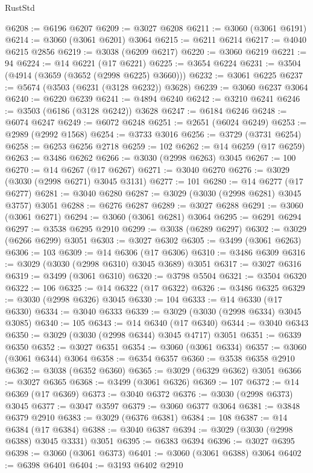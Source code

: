 \begin{lexlean}{RustStd}
\begin{coremodule}
@6208 := @6196 @6207
@6209 := @3027 @6208
@6211 := @3060 (@3061 @6191)
@6214 := @3060 (@3061 @6201) @3064
@6215 := @6211 @6214
@6217 := @4040 @6215 @2856
@6219 := @3038 (@6209 @6217)
@6220 := @3060 @6219
@6221 := 94
@6224 := @14 @6221 (@17 @6221)
@6225 := @3654 @6224
@6231 := @3504 (@4914 (@3659 (@3652 (@2998 @6225) @3660)))
@6232 := @3061 @6225
@6237 := @5674 (@3503 (@6231 (@3128 @6232)) @3628)
@6239 := @3060 @6237 @3064
@6240 := @6220 @6239
@6241 := @4894 @6240
@6242 := @3210 @6241
@6246 := @3503 (@6186 (@3128 @6242)) @3628
@6247 := @6184 @6246
@6248 := @6074 @6247
@6249 := @6072 @6248
@6251 := @2651 (@6024 @6249)
@6253 := @2989 (@2992 @1568)
@6254 := @3733 @3016
@6256 := @3729 (@3731 @6254)
@6258 := @6253 @6256 @2718
@6259 := 102
@6262 := @14 @6259 (@17 @6259)
@6263 := @3486 @6262
@6266 := @3030 (@2998 @6263) @3045
@6267 := 100
@6270 := @14 @6267 (@17 @6267)
@6271 := @3040 @6270
@6276 := @3029 (@3030 (@2998 @6271) @3045 @3131)
@6277 := 101
@6280 := @14 @6277 (@17 @6277)
@6281 := @3040 @6280
@6287 := @3029 (@3030 (@2998 @6281) @3045 @3757) @3051
@6288 := @6276 @6287
@6289 := @3027 @6288
@6291 := @3060 (@3061 @6271)
@6294 := @3060 (@3061 @6281) @3064
@6295 := @6291 @6294
@6297 := @3538 @6295 @2910
@6299 := @3038 (@6289 @6297)
@6302 := @3029 (@6266 @6299) @3051
@6303 := @3027 @6302
@6305 := @3499 (@3061 @6263)
@6306 := 103
@6309 := @14 @6306 (@17 @6306)
@6310 := @3486 @6309
@6316 := @3029 (@3030 (@2998 @6310) @3045 @3689) @3051
@6317 := @3027 @6316
@6319 := @3499 (@3061 @6310)
@6320 := @3798 @5504
@6321 := @3504 @6320
@6322 := 106
@6325 := @14 @6322 (@17 @6322)
@6326 := @3486 @6325
@6329 := @3030 (@2998 @6326) @3045
@6330 := 104
@6333 := @14 @6330 (@17 @6330)
@6334 := @3040 @6333
@6339 := @3029 (@3030 (@2998 @6334) @3045 @3085)
@6340 := 105
@6343 := @14 @6340 (@17 @6340)
@6344 := @3040 @6343
@6350 := @3029 (@3030 (@2998 @6344) @3045 @4717) @3051
@6351 := @6339 @6350
@6352 := @3027 @6351
@6354 := @3060 (@3061 @6334)
@6357 := @3060 (@3061 @6344) @3064
@6358 := @6354 @6357
@6360 := @3538 @6358 @2910
@6362 := @3038 (@6352 @6360)
@6365 := @3029 (@6329 @6362) @3051
@6366 := @3027 @6365
@6368 := @3499 (@3061 @6326)
@6369 := 107
@6372 := @14 @6369 (@17 @6369)
@6373 := @3040 @6372
@6376 := @3030 (@2998 @6373) @3045
@6377 := @3047 @3597
@6379 := @3060 @6377 @3064
@6381 := @3848 @6379 @2910
@6383 := @3029 (@6376 @6381)
@6384 := 108
@6387 := @14 @6384 (@17 @6384)
@6388 := @3040 @6387
@6394 := @3029 (@3030 (@2998 @6388) @3045 @3331) @3051
@6395 := @6383 @6394
@6396 := @3027 @6395
@6398 := @3060 (@3061 @6373)
@6401 := @3060 (@3061 @6388) @3064
@6402 := @6398 @6401
@6404 := @3193 @6402 @2910

\end{coremodule}
\end{lexlean}
